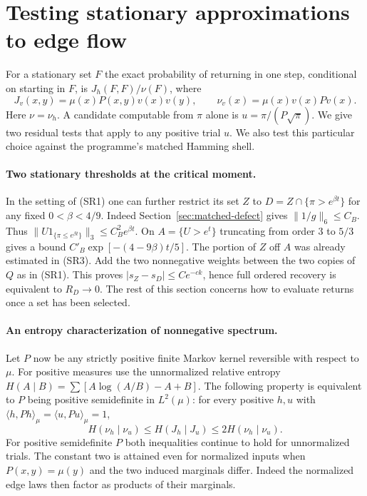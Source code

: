 \section{Testing stationary approximations to edge flow}
\label{sec:trial-flow}
For a stationary set $F$ the exact probability of returning in one step,
conditional on starting in $F$, is $J_h(F,F)/\nu(F)$, where
\[
 J_v(x,y)=\mu(x)P(x,y)v(x)v(y),\qquad \nu_v(x)=\mu(x)v(x)Pv(x).
\]
Here $\nu=\nu_h$. A candidate computable from $\pi$ alone is $u=\pi/(P\sqrt\pi)$.
We give two residual tests that apply to any positive trial $u$. We also test
this particular choice against the programme's matched Hamming shell.

\paragraph{Two stationary thresholds at the critical moment.}
In the setting of (SR1) one can further restrict its set $Z$ to
$D=Z\cap\{\pi>e^{\beta t}\}$ for any fixed $0<\beta<4/9$. Indeed
Section~\ref{sec:matched-defect} gives $\|1/g\|_6\le C_B$.
Thus $\|U1_{\{\pi\le e^{\beta t}\}}\|_3\le C_B^2 e^{\beta t}$.
On $A=\{U>e^t\}$ truncating from order $3$ to $5/3$ gives a bound
$C'_B\exp[-(4-9\beta)t/5]$. The portion of $Z$ off $A$ was already
estimated in (SR3). Add the two nonnegative weights between the two
copies of $Q$ as in (SR1). This proves $|s_Z-s_D|\le Ce^{-ck}$, hence
full ordered recovery is equivalent to $R_D\to0$. The rest of this
section concerns how to evaluate returns once a set has been selected.

\paragraph{An entropy characterization of nonnegative spectrum.}
Let $P$ now be any strictly positive finite Markov kernel reversible
with respect to $\mu$. For positive measures use the unnormalized
relative entropy $H(A\mid B)=\sum[A\log(A/B)-A+B]$. The following
property is equivalent to $P$ being positive semidefinite in $L^2(\mu)$:
for every positive $h,u$ with $\langle h,Ph\rangle_\mu=
\langle u,Pu\rangle_\mu=1$,
\[
       H(\nu_h\mid\nu_u)\le H(J_h\mid J_u)
                    \le 2H(\nu_h\mid\nu_u).                    \tag{EF1}
\]
For positive semidefinite $P$ both inequalities continue to hold for
unnormalized trials. The constant two is attained even for normalized
inputs when $P(x,y)=\mu(y)$ and the two induced marginals differ.
Indeed the normalized edge laws then factor as products of their marginals.


